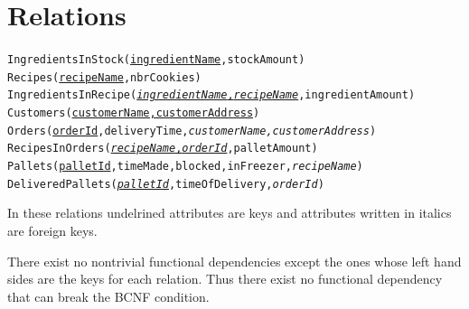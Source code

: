 \documentclass[a4paper]{article}
\begin{document}
\section{Relations}

\texttt{IngredientsInStock(\underline{ingredientName},stockAmount)} \\
\texttt{Recipes(\underline{recipeName},nbrCookies)} \\
\texttt{IngredientsInRecipe(\underline{\textit{ingredientName},\textit{recipeName}},ingredientAmount)} \\
\texttt{Customers(\underline{customerName,customerAddress})} \\
\texttt{Orders(\underline{orderId},deliveryTime,\textit{customerName,customerAddress})} \\
\texttt{RecipesInOrders(\underline{\textit{recipeName},\textit{orderId}},palletAmount)} \\
\texttt{Pallets(\underline{palletId},timeMade,blocked,inFreezer,\textit{recipeName})} \\
\texttt{DeliveredPallets(\underline{\textit{palletId}},timeOfDelivery,\textit{orderId})}

In these relations undelrined attributes are keys and attributes written in italics are foreign keys.

There exist no nontrivial functional dependencies except the ones whose left hand sides are the keys for each relation. Thus there exist no functional dependency that can break the BCNF condition.
\end{document}
